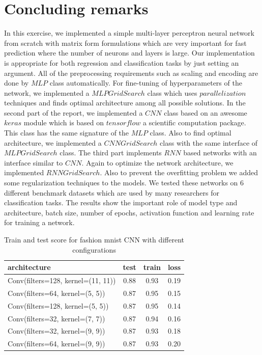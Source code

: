 \documentclass[10pt]{SelfArx} %
\begin{document}
	\section{Concluding remarks}
	In this exercise, we implemented a simple multi-layer perceptron neural network from scratch with matrix form formulations which are very important for fast prediction where the number of neurons and layers is large. Our implementation is appropriate for both regression and classification tasks by just setting an argument. All of the preprocessing requirements such as scaling and encoding are done by $MLP$ class automatically. For fine-tuning of hyperparameters of the network, we implemented a $MLPGridSearch$ class which uses $parallelization$ techniques and finds optimal architecture among all possible solutions.  
	In the second part of the report, we implemented a $CNN$ class based on an awesome $keras$ module which is based on $tensorflow$ a scientific computation package. This class has the same signature of the $MLP$ class. Also to find optimal architecture, we implemented a $CNNGridSearch$ class with the same interface of $MLPGridSearch$ class. The third part implements $RNN$ based networks with an interface similar to $CNN$. Again to optimize the network architecture, we implemented $RNNGridSearch$. Also to prevent the overfitting problem we added some regularization techniques to the models. We tested these networks on 6 different benchmark datasets which are used by many researchers for classification tasks. The results show the important role of model type and architecture, batch size, number of epochs, activation function and learning rate for training a network. 
	
	\begin{table}[]
		\begin{tabular*}{1\linewidth}{@{\extracolsep{\fill} }lccc@{}}
			\toprule
			architecture & test & train & loss \\ \midrule
			Conv(filters=128, kernel=(11, 11)) & 0.88 & 0.93 & 0.19 \\
			Conv(filters=64, kernel=(5, 5)) & 0.87 & 0.95 & 0.15 \\
			Conv(filters=128, kernel=(5, 5)) & 0.87 & 0.95 & 0.14 \\
			Conv(filters=32, kernel=(7, 7)) & 0.87 & 0.94 & 0.16 \\
			Conv(filters=32, kernel=(9, 9)) & 0.87 & 0.93 & 0.18 \\
			Conv(filters=64, kernel=(9, 9)) & 0.87 & 0.93 & 0.20 \\ \bottomrule
		\end{tabular*}
		\caption{Train and test score for fashion mnist CNN  with different configurations}
		\label{tfashion1}
	\end{table}
	
\end{document}
